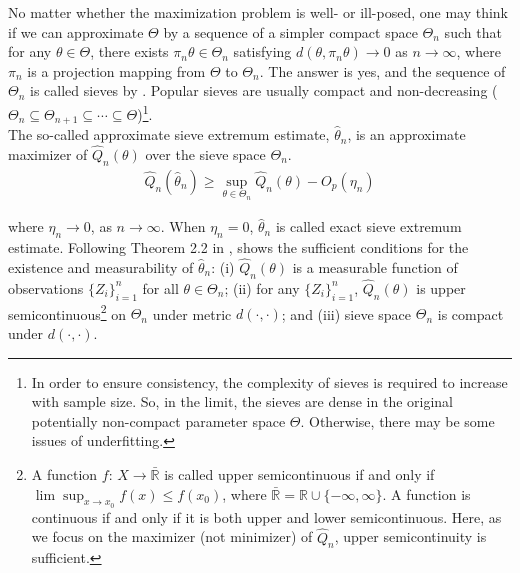 \documentclass[12pt, a4paper]{article}
\theoremstyle{MAstyle} \newtheorem{assumption}{Assumption}[section]
\theoremstyle{MAstyle} \newtheorem{definition}{Definition}[section]
\theoremstyle{MAstyle} \newtheorem{theorem}{Theorem}[section]
\theoremstyle{MAstyle} \newtheorem{corollary}{Corollary}[section]
\begin{document}
            No matter whether the maximization problem is well- or ill-posed, one may think if we can approximate $\mathit{\Theta}$ by a sequence of a simpler compact space $\mathit{\Theta_n}$ such that for any $\theta \in \mathit{\Theta}$, there exists $\pi_n\theta \in \mathit{\Theta_n}$ satisfying $d(\theta, \pi_n\theta) \rightarrow 0$ as $n \rightarrow \infty$, where $\pi_n$ is a projection mapping from $\mathit{\Theta}$ to $\mathit{\Theta_n}$. The answer is yes, and the sequence of $\mathit{\Theta_n}$ is called sieves by \cite{Grenander_1981}. Popular sieves are usually compact and non-decreasing ($\mathit{\Theta_n} \subseteq \mathit{\Theta_{n+1}} \subseteq \cdots \subseteq \mathit{\Theta}$)\footnote{In order to ensure consistency, the complexity of sieves is required to increase with sample size. So, in the limit, the sieves are dense in the original potentially non-compact parameter space $\mathit{\Theta}$. Otherwise, there may be some issues of underfitting.}.\\

            The so-called approximate sieve extremum estimate, $\hat{\theta}_n$, is an approximate maximizer of $\widehat{Q}_n(\theta)$ over the sieve space $\mathit{\Theta_n}$.
            \begin{align}\label{approx sieve extremum}
                \widehat{Q}_n(\hat{\theta}_n) \ge \sup_{\theta \in \mathit{\Theta_n}} \widehat{Q}_n(\theta)-O_p(\eta_n)
            \end{align}

            where $\eta_n \rightarrow 0$, as $n \rightarrow \infty$. When $\eta_n = 0$, $\hat{\theta}_n$ is called exact sieve extremum estimate. Following Theorem 2.2 in \cite{White_Wooldridge_1991}, \cite{Chen_2007} shows the sufficient conditions for the existence and measurability of $\hat{\theta}_n$: (i) $\widehat{Q}_n(\theta)$ is a measurable function of observations $\{Z_i\}_{i=1}^n$ for all $\theta \in \mathit{\Theta_n}$; (ii) for any $\{Z_i\}_{i=1}^n$, $\widehat{Q}_n(\theta)$ is upper semicontinuous\footnote{A function $f$: $X \rightarrow \bar{\mathbb{R}}$ is called upper semicontinuous if and only if $\lim \sup_{x \rightarrow x_0} f(x) \le f(x_0)$, where $\bar{\mathbb{R}}=\mathbb{R} \cup \{ -\infty, \infty \}$. A function is continuous if and only if it is both upper and lower semicontinuous. Here, as we focus on the maximizer (not minimizer) of $\widehat{Q}_n$, upper semicontinuity is sufficient.} on $\mathit{\Theta_n}$ under metric $d(\cdot,\cdot)$; and (iii) sieve space $\mathit{\Theta_n}$ is compact under $d(\cdot,\cdot)$.\\
\end{document}
